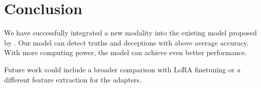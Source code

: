 \section{Conclusion}
\label{sec:conclusion}
We have successfully integrated a new modality into the existing model proposed by \cite{guo2023audio}. 
Our model can detect truths and deceptions with above average accuracy. 
With more computing power, the model can achieve even better performance.

Future work could include a broader comparison with LoRA finetuning or a different feature extraction for the adapters. 
